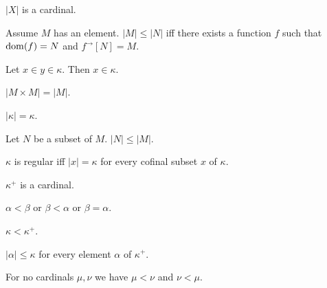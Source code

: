 \documentclass{article}
\newcommand{\Prod}[2]{#1\times #2}
\newcommand{\Succ}[1]{#1^{+}}
\newcommand{\image}[2]{#1^{\to}[#2]}
\newcommand{\card}[1]{\left|#1\right|}
\begin{document}
\begin{forthel}
    \begin{signature}[Cardinality]
      $\card{X}$ is a cardinal.
    \end{signature}

    \begin{axiom}
      Assume $M$ has an element.
      $\card{M} \leq \card{N}$ iff there exists a function $f$ such that $\operatorname{dom}(f) = N$ and $\image{f}{N} = M$.
    \end{axiom}

    \begin{axiom}[Transitivity]
      Let $x\in y\in \kappa$.
      Then $x\in \kappa$.
    \end{axiom}

    \begin{axiom}
      $\card{\Prod{M}{M}} = \card{M}$.
    \end{axiom}

    \begin{axiom}
      $\card{\kappa} = \kappa$.
    \end{axiom}

    \begin{axiom}
      Let $N$ be a subset of $M$. $\card{N} \leq \card{M}$.
    \end{axiom}

    \begin{definition}
      $\kappa$ is regular iff $\card{x} = \kappa$ for every cofinal subset $x$ of $\kappa$.
    \end{definition}

    \begin{signature}
      $\Succ{\kappa}$ is a cardinal.
    \end{signature}

    \begin{axiom}
      $\alpha < \beta$ or $\beta < \alpha$ or $\beta = \alpha$.
    \end{axiom}

    \begin{axiom}
      $\kappa < \Succ{\kappa}$.
    \end{axiom}

    \begin{axiom}
      $\card{\alpha} \leq \kappa$ for every element $\alpha$ of $\Succ{\kappa}$.
    \end{axiom}

    \begin{axiom}
      For no cardinals $\mu, \nu$ we have $\mu < \nu$ and $\nu < \mu$.
    \end{axiom}


\end{forthel}
\end{document}
